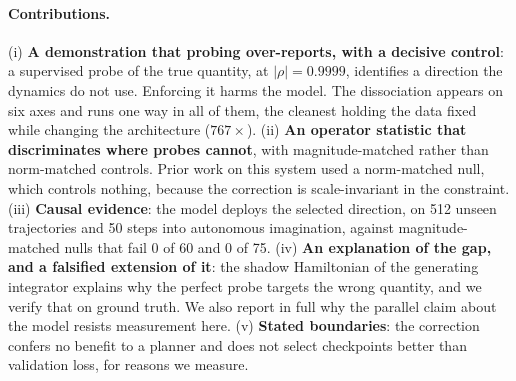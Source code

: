 \paragraph{Contributions.}
(i) \textbf{A demonstration that probing over-reports, with a decisive control}: a supervised probe
of the true quantity, at $|\rho| = 0.9999$, identifies a direction the dynamics do not use.
Enforcing it harms the model. The dissociation appears on six axes and runs one way in all of them,
the cleanest holding the data fixed while changing the architecture ($767\times$).
(ii) \textbf{An operator statistic that discriminates where probes cannot}, with magnitude-matched
rather than norm-matched controls. Prior work on this system used a norm-matched null, which controls
nothing, because the correction is scale-invariant in the constraint.
(iii) \textbf{Causal evidence}: the model deploys the selected direction, on 512 unseen trajectories
and 50 steps into autonomous imagination, against magnitude-matched nulls that fail 0 of 60 and 0 of
75.
(iv) \textbf{An explanation of the gap, and a falsified extension of it}: the shadow Hamiltonian of
the generating integrator explains why the perfect probe targets the wrong quantity, and we verify
that on ground truth. We also report in full why the parallel claim about the model resists
measurement here.
(v) \textbf{Stated boundaries}: the correction confers no benefit to a planner and does not select
checkpoints better than validation loss, for reasons we measure.
